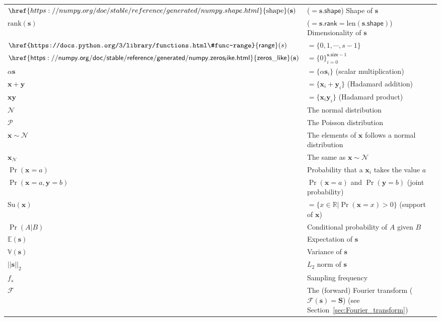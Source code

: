 \documentclass{report}%
\begin{document}
\begin{tabular}{ll}
  $\href{https://numpy.org/doc/stable/reference/generated/numpy.shape.html}{\text{shape}}(\mathbf{s})$ & ($=\mathbf{s}.{\mathsf{shape}}$) Shape of $\mathbf{s}$ \\
  $\text{rank}(\mathbf{s})$ & ($=\mathbf{s}.\mathsf{rank}=\text{len}(\mathbf{s}.\mathsf{shape})$) Dimensionality of $\mathbf{s}$ \\
  $\mathsf{\href{https://docs.python.org/3/library/functions.html\#func-range}{range}}(s)$ & $=\{0, 1, \cdots, s-1\}$ \\
  $\mathsf{\href{https://numpy.org/doc/stable/reference/generated/numpy.zeros_like.html}{zeros\_like}}(\mathbf{s})$ & $=\{0\}_{i=0}^{\mathbf{s}.\mathsf{size}-1}$ \\
  $\alpha\mathbf{s}$ & $=\{\alpha\mathbf{s}_i\}$ (scalar multiplication) \\
  $\mathbf{x}+\mathbf{y}$ & $=\{\mathbf{x}_i + \mathbf{y}_i\}$ (Hadamard addition) \\ 
  $\mathbf{x}\mathbf{y}$ & $=\{\mathbf{x}_i\mathbf{y}_i\}$ (Hadamard product) \\ 
  $\mathcal{N}$ & The normal distribution \\ 
  $\mathcal{P}$ & The Poisson distribution \\
  $\mathbf{x}\sim\mathcal{N}$ & The elements of $\mathbf{x}$ follows a normal distribution \\
  $\mathbf{x}_{\mathcal{N}}$ & The same as $\mathbf{x}\sim\mathcal{N}$ \\
  $\Pr(\mathbf{x}=a)$ & Probability that a $\mathbf{x}_i$ takes the value $a$ \\
  $\Pr(\mathbf{x}=a, \mathbf{y}=b)$ & $\Pr(\mathbf{x}=a)$ and $\Pr(\mathbf{y}=b)$ (joint probability)  \\
  $\text{Su}(\mathbf{x})$ & $=\{x\in\mathbb{R}|\Pr(\mathbf{x}=x)>0\}$ (support of $\mathbf{x}$)\\
  $\Pr(A|B)$ & Conditional probability of $A$ given $B$ \\
  $\mathbb{E}(\mathbf{s})$ & Expectation of $\mathbf{s}$ \\
  $\mathbb{V}(\mathbf{s})$ & Variance of $\mathbf{s}$ \\
  $||\mathbf{s}||_2$ & $L_2$ norm of $\mathbf{s}$ \\
  $f_s$ & Sampling frequency \\
  $\mathcal{F}$ & The (forward) Fourier transform ($\mathcal{F}(\mathbf{s})=\mathbf{S}$) (see Section~\ref{sec:Fourier_transform})\\

\end{tabular}
\end{document}
